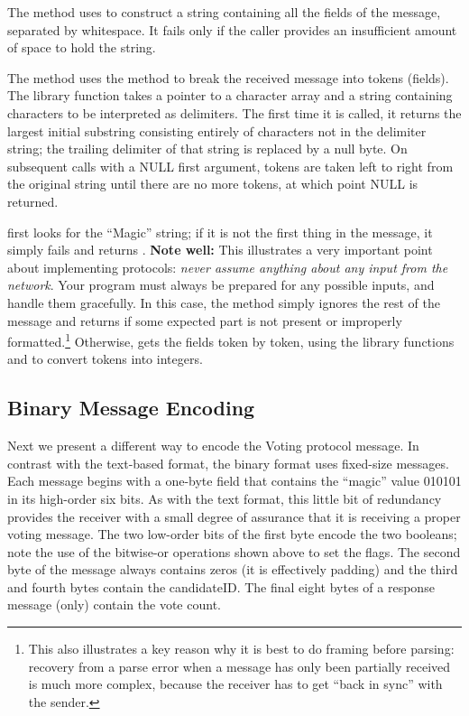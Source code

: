 
The  method uses  to construct a string
containing all the fields of the message, separated by whitespace.  It
fails only if the caller provides an insufficient amount of space to
hold the string.

The  method uses the  method to
break the received message into tokens (fields).  The 
library function takes a pointer to a character array and a string
containing characters to be interpreted as delimiters.
The first time it is called, it returns the
largest initial substring consisting entirely of characters not in the
delimiter string; the trailing delimiter of that string is replaced by
a null byte.  On subsequent calls with a NULL first argument, tokens
are taken left to right from the original string until there are no
more tokens, at which point NULL is returned.

 first looks for the ``Magic'' string; if
it is not the first thing in the message, it simply fails and returns
.
%
\textbf{Note well:}
This illustrates a very important point about implementing protocols:
\emph{never assume anything about any input from the network}.  Your
program must always be prepared for any possible inputs, and handle
them gracefully.  In this case, the  method simply ignores
the rest of the message and returns  if some expected part is not
present or improperly formatted.\footnote{This also illustrates a key
  reason why it is best to do framing 
  before parsing: recovery from a parse error when a message has only
  been partially received is much more complex, because the receiver
  has to get ``back in sync'' with the sender.%
}
%
Otherwise,  gets
the fields token by token, using the library functions 
and  to convert tokens into integers.

\subsection{Binary Message Encoding}
\label{sect:binEncoding}

Next we present a different way to encode the Voting protocol message.
In contrast with the text-based format, the binary format uses
fixed-size messages.  Each message begins with a one-byte field that
contains the ``magic'' value 010101 in its high-order six bits.  As
with the text format, this
little bit of redundancy provides the receiver with a small degree of
assurance that it is receiving a proper voting message.  The two
low-order bits of the first byte encode the two booleans; note the use
of the bitwise-or operations shown above to set the flags.  The second
byte of the message always contains zeros (it is effectively padding)
and the third and fourth
bytes contain the candidateID.  The final eight bytes of a response
message (only) contain the vote count.

